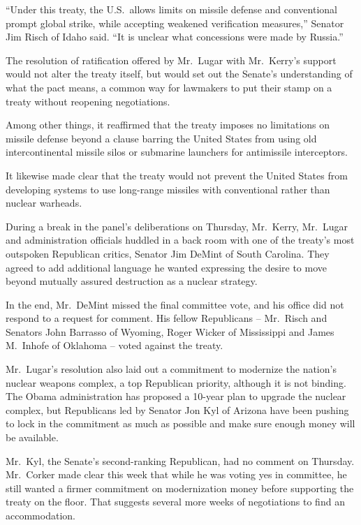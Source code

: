 ﻿\documentclass[12pt]{article}
\begin{document}
``Under this treaty, the U.S.~allows limits on missile defense and conventional prompt global
strike, while accepting weakened verification measures,'' Senator Jim Risch of Idaho said. ``It is
unclear what concessions were made by Russia.''

The resolution of ratification offered by Mr.~Lugar with Mr.~Kerry's support would not alter the
treaty itself, but would set out the Senate's understanding of what the pact means, a common way for
lawmakers to put their stamp on a treaty without reopening negotiations.

Among other things, it reaffirmed that the treaty imposes no limitations on missile defense beyond a
clause barring the United States from using old intercontinental missile silos or submarine
launchers for antimissile interceptors.

It likewise made clear that the treaty would not prevent the United States from developing systems
to use long-range missiles with conventional rather than nuclear warheads.

During a break in the panel's deliberations on Thursday, Mr.~Kerry, Mr.~Lugar and administration
officials huddled in a back room with one of the treaty's most outspoken Republican critics, Senator
Jim DeMint of South Carolina. They agreed to add additional language he wanted expressing the desire
to move beyond mutually assured destruction as a nuclear strategy.

In the end, Mr.~DeMint missed the final committee vote, and his office did not respond to a request
for comment. His fellow Republicans -- Mr.~Risch and Senators John Barrasso of Wyoming, Roger Wicker
of Mississippi and James M.~Inhofe of Oklahoma -- voted against the treaty.

Mr.~Lugar's resolution also laid out a commitment to modernize the nation's nuclear weapons complex,
a top Republican priority, although it is not binding. The Obama administration has proposed a
10-year plan to upgrade the nuclear complex, but Republicans led by Senator Jon Kyl of Arizona have
been pushing to lock in the commitment as much as possible and make sure enough money will be
available.

Mr.~Kyl, the Senate's second-ranking Republican, had no comment on Thursday. Mr.~Corker made clear
this week that while he was voting yes in committee, he still wanted a firmer commitment on
modernization money before supporting the treaty on the floor. That suggests several more weeks of
negotiations to find an accommodation.
\end{document}
